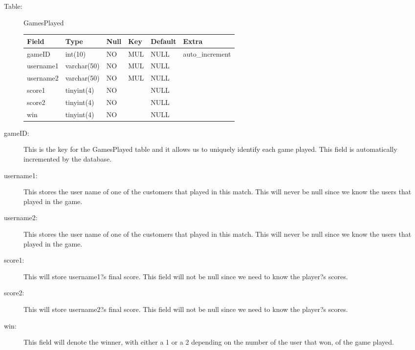 			\begin{description}
				\item[Table:] GamesPlayed

				\begin{center}
					\begin{tabular}{ | l | l | l | l | l | l|}
						\hline
						Field & Type & Null & Key & Default & Extra \\ \hline \hline
						gameID & int(10) & NO & MUL & NULL & auto\_increment \\ \hline
						username1 & varchar(50) & NO & MUL & NULL &\hspace{1 pc}  \\ \hline
						username2 & varchar(50) & NO & MUL& NULL &\hspace{1 pc}  \\ \hline
						score1 & tinyint(4) & NO &\hspace{1 pc} & NULL &\hspace{1 pc}  \\ \hline
						score2 & tinyint(4) & NO &\hspace{1 pc} & NULL &\hspace{1 pc}   \\\hline
						win & tinyint(4) & NO &\hspace{1 pc} & NULL & \hspace{1 pc} \\
						\hline
					\end{tabular}
				\end{center}
				
				\item[gameID:] This is the key for the GamesPlayed table and it allows us to uniquely identify each game played. This field is automatically incremented by the database.
				\item[username1:] This stores the user name of one of the customers that played in this match. This will never be null since we know the users that played in the game.
				\item[username2:] This stores the user name of one of the customers that played in this match. This will never be null since we know the users that played in the game.
				\item[score1:] This will store username1?s final score. This field will not be null since we need to know the player?s scores.
				\item[score2:] This will store username2?s final score. This field will not be null since we need to know the player?s scores.
				\item[win:] This field will denote the winner, with either a 1 or a 2 depending on the number of the user that won, of the game played.

			\end{description}
				
